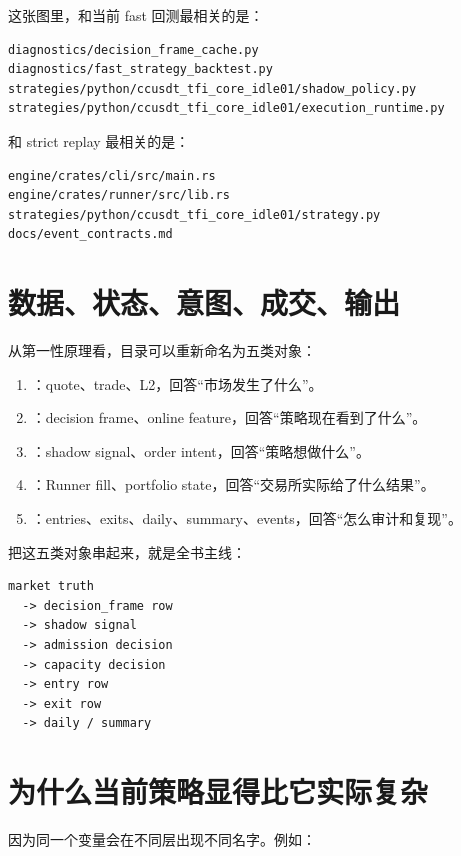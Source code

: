 这张图里，和当前 fast 回测最相关的是：

\begin{lstlisting}
diagnostics/decision_frame_cache.py
diagnostics/fast_strategy_backtest.py
strategies/python/ccusdt_tfi_core_idle01/shadow_policy.py
strategies/python/ccusdt_tfi_core_idle01/execution_runtime.py
\end{lstlisting}

和 strict replay 最相关的是：

\begin{lstlisting}
engine/crates/cli/src/main.rs
engine/crates/runner/src/lib.rs
strategies/python/ccusdt_tfi_core_idle01/strategy.py
docs/event_contracts.md
\end{lstlisting}

\section{数据、状态、意图、成交、输出}

从第一性原理看，目录可以重新命名为五类对象：

\begin{enumerate}[leftmargin=2em]
  \item {}：quote、trade、L2，回答“市场发生了什么”。
  \item {}：decision frame、online feature，回答“策略现在看到了什么”。
  \item {}：shadow signal、order intent，回答“策略想做什么”。
  \item {}：Runner fill、portfolio state，回答“交易所实际给了什么结果”。
  \item {}：entries、exits、daily、summary、events，回答“怎么审计和复现”。
\end{enumerate}

把这五类对象串起来，就是全书主线：

\begin{lstlisting}
market truth
  -> decision_frame row
  -> shadow signal
  -> admission decision
  -> capacity decision
  -> entry row
  -> exit row
  -> daily / summary
\end{lstlisting}

\section{为什么当前策略显得比它实际复杂}

因为同一个变量会在不同层出现不同名字。例如：

